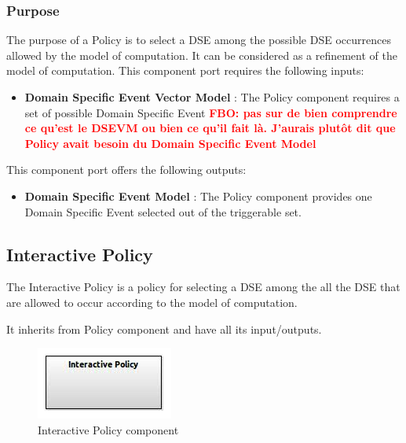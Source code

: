 \documentclass{gemoc} %
\begin{document}
\subsubsection{Purpose}
The purpose of a Policy is to select a DSE among the possible DSE occurrences allowed by the model of computation. It can be considered as a refinement of the model of computation.
This component port requires the following inputs:
\begin{itemize}
  \item \textbf{Domain Specific Event Vector Model} :
The Policy component requires a set of possible Domain Specific Event
\textbf{\textcolor{red}{FBO: pas sur de bien comprendre ce qu'est le DSEVM ou bien ce qu'il fait l\`a. J'aurais plut\^ot dit que Policy avait besoin du Domain Specific Event Model}}
\end{itemize}

This component port offers the following outputs:
\begin{itemize}
  \item \textbf{Domain Specific Event Model} :
The Policy component provides one Domain Specific Event selected out of the triggerable set.
\end{itemize}

\subsection{Interactive Policy}
The Interactive Policy is a policy for selecting a DSE among the all the DSE that are allowed to occur according to the model of computation.


It inherits from Policy component and have all its input/outputs.
\begin{figure}[htp]
	\begin{center}
	\includegraphics*[trim=0.0cm 0.0cm 0cm 0.0cm, clip=true, scale=1.0]{../images/generated/Generated_Interactive Policy.jpg}
	\caption{Interactive Policy component}
	\end{center}
\end{figure}
\end{document}
